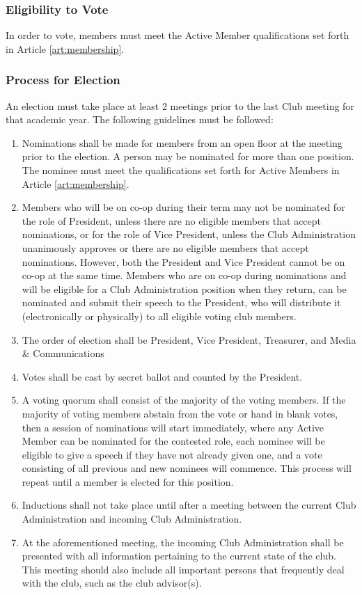 \documentclass[english,11pt]{article}
\begin{document}
\subsubsection{Eligibility to Vote} \label{subsect:cadmin:selection:eligibility}
In order to vote, members must meet the Active Member qualifications set forth in Article \ref{art:membership}.

\subsubsection{Process for Election} \label{subsect:cadmin:selection:election}
An election must take place at least 2 meetings prior to the last Club meeting for that academic year. The following guidelines must be followed:

\begin{enumerate}[label=\alph*.]
    \item Nominations shall be made for members from an open floor at the meeting prior to the election.
          A person may be nominated for more than one position. The nominee must meet the qualifications set forth for Active Members in Article \ref{art:membership}.
    \item Members who will be on co-op during their term may not be nominated for the role of President, unless there are no eligible members that accept nominations, or for the role of Vice President, unless the Club Administration unanimously approves or there are no eligible members that accept nominations.
          However, both the President and Vice President cannot be on co-op at the same time.
          Members who are on co-op during nominations and will be eligible for a Club Administration position when they return, can be nominated and submit their speech to the President, who will distribute it (electronically or physically) to all eligible voting club members.
    \item The order of election shall be President, Vice President, Treasurer, and Media \& Communications
    \item Votes shall be cast by secret ballot and counted by the President.
    \item A voting quorum shall consist of the majority of the voting members.
          If the majority of voting members abstain from the vote or hand in blank votes, then a session of nominations will start immediately, where any Active Member can be nominated for the contested role, each nominee will be eligible to give a speech if they have not already given one, and a vote consisting of all previous and new nominees will commence.
          This process will repeat until a member is elected for this position.
    \item Inductions shall not take place until after a meeting between the current Club Administration and incoming Club Administration.
    \item At the aforementioned meeting, the incoming Club Administration shall be presented with all information pertaining to the current state of the club.
          This meeting should also include all important persons that frequently deal with the club, such as the club advisor(s).
\end{enumerate}
\end{document}
